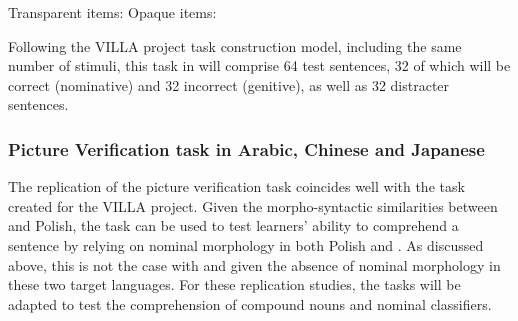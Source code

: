 \documentclass[output=paper,colorlinks,citecolor=brown,modfonts,nonflat]{../langscibook}
\begin{document}
\ea%
    \label{ex:watorek:6}
    \ea%
    \label{ex:watorek:6a}
    Transparent items:
        \z
    \newpage
    \ex%
    \label{ex:watorek:6b}
    Opaque items:
        \z
    \z
\z

Following the VILLA project task construction model, including the same number of stimuli, this task in  will comprise 64 test sentences, 32 of which will be correct (nominative) and 32 incorrect (genitive), as well as 32 distracter sentences.

\subsubsection{Picture Verification task in Arabic, Chinese and Japanese}\label{sec:watorek:4.2.2}

The  replication of the picture verification task coincides well with the task created for the VILLA project. Given the morpho-syntactic similarities between  and Polish, the task can be used to test learners’ ability to comprehend a sentence by relying on nominal morphology in both Polish and . As discussed above, this is not the case with  and  given the absence of nominal morphology in these two target languages. For these replication studies, the tasks will be adapted to test the comprehension of compound nouns and nominal classifiers.
\end{document}
